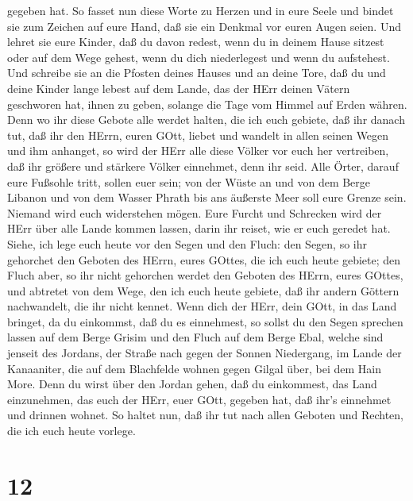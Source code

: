 gegeben hat.  So fasset nun diese Worte zu Herzen und in
eure Seele und bindet sie zum Zeichen auf eure Hand, daß sie ein Denkmal
vor euren Augen seien.  Und lehret sie eure Kinder, daß du
davon redest, wenn du in deinem Hause sitzest oder auf dem Wege gehest,
wenn du dich niederlegest und wenn du aufstehest.  Und
schreibe sie an die Pfosten deines Hauses und an deine Tore,
 daß du und deine Kinder lange lebest auf dem Lande, das
der HErr deinen Vätern geschworen hat, ihnen zu geben, solange die Tage
vom Himmel auf Erden währen.  Denn wo ihr diese Gebote alle
werdet halten, die ich euch gebiete, daß ihr danach tut, daß ihr den
HErrn, euren GOtt, liebet und wandelt in allen seinen Wegen und ihm
anhanget,  so wird der HErr alle diese Völker vor euch her
vertreiben, daß ihr größere und stärkere Völker einnehmet, denn ihr
seid.  Alle Örter, darauf eure Fußsohle tritt, sollen euer
sein; von der Wüste an und von dem Berge Libanon und von dem Wasser
Phrath bis ans äußerste Meer soll eure Grenze sein. 
Niemand wird euch widerstehen mögen. Eure Furcht und Schrecken wird der
HErr über alle Lande kommen lassen, darin ihr reiset, wie er euch
geredet hat.  Siehe, ich lege euch heute vor den Segen und
den Fluch:  den Segen, so ihr gehorchet den Geboten des
HErrn, eures GOttes, die ich euch heute gebiete;  den Fluch
aber, so ihr nicht gehorchen werdet den Geboten des HErrn, eures GOttes,
und abtretet von dem Wege, den ich euch heute gebiete, daß ihr andern
Göttern nachwandelt, die ihr nicht kennet.  Wenn dich der
HErr, dein GOtt, in das Land bringet, da du einkommst, daß du es
einnehmest, so sollst du den Segen sprechen lassen auf dem Berge Grisim
und den Fluch auf dem Berge Ebal,  welche sind jenseit des
Jordans, der Straße nach gegen der Sonnen Niedergang, im Lande der
Kanaaniter, die auf dem Blachfelde wohnen gegen Gilgal über, bei dem
Hain More.  Denn du wirst über den Jordan gehen, daß du
einkommest, das Land einzunehmen, das euch der HErr, euer GOtt, gegeben
hat, daß ihr's einnehmet und drinnen wohnet.  So haltet
nun, daß ihr tut nach allen Geboten und Rechten, die ich euch heute
vorlege.

\hypertarget{section-11}{%
\section{12}\label{section-11}}


